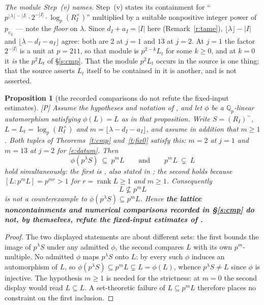 \documentclass[11pt]{article}
\theoremstyle{plain}
\newtheorem{proposition}[theorem]{Proposition}
\theoremstyle{definition}
\begin{document}
\begin{enumerate}[label=(W\arabic*),leftmargin=3.2em,itemsep=3pt]
 \emph{The module Step~(v) names.}  Step~(v) states its containment for
 ``$p^{\lfloor\lambda\rfloor-|I|}\cdot2^{-|I|}\cdot\log_p(R_I^{\times})$''
 multiplied by a suitable nonpositive integer power of $p_{v_{\mathbb{Q}}}$ ---
 note the \emph{floor} on $\lambda$.  Since $d_I+a_I=|I|$ here
 (Remark~\ref{r:tame}), $\lfloor\lambda\rfloor-|I|$ and
 $\lfloor\lambda-d_I-a_I\rfloor$ agree: both are $2$ at $j=1$ and $13$ at $j=2$.
 At $j=1$ the factor $2^{-|I|}$ is a unit at $p=211$, so that module is
 $p^{2-k}L_t$ for some $k\ge0$, and at $k=0$ it \emph{is} the $p^2L_t$ of
 \S\ref{s:cmp}.  That the module $p^2L_t$ occurs in the source is one thing;
 that the source asserts $L_t$ itself to be contained in it is another, and is
 not asserted.
\end{enumerate}

\begin{proposition}[the recorded comparisons do not refute the fixed-input
estimates]\label{p:nogo}
\textup{[P]}  Assume the hypotheses and notation of \cite[Prop.~1.2]{IUT4}, and
let $\phi$ be a $\mathbb{Q}_p$-linear automorphism satisfying $\phi(L)=L$ as in
that proposition.  Write $S=(R_I)^{\sim}$, $L=L_t=\log_p(R_I^{\times})$ and
$m=\lfloor\lambda-d_I-a_I\rfloor$, and assume in addition that $m\ge1$.  Both
tuples of Theorems~\ref{t:cmp} and~\ref{t:fix0} satisfy this: $m=2$ at $j=1$ and
$m=13$ at $j=2$ for \eqref{e:datum}.  Then
\[
 \phi(p^{\lambda}S)\ \subseteq\ p^{m}L
 \qquad\text{and}\qquad
 p^{m}L\ \subsetneq\ L
\]
hold \emph{simultaneously}: the first is \cite[Prop.~1.2(ii)]{IUT4}, also stated
in \cite[Prop.~1.4(iii)]{IUT4}; the second holds because
$[L:p^{m}L]=p^{mr}>1$ for $r=\operatorname{rank}L\ge1$ and $m\ge1$.
Consequently
\[
 L\not\subseteq p^{m}L
\]
is \emph{not} a counterexample to $\phi(p^{\lambda}S)\subseteq p^{m}L$.  Hence
\textbf{the lattice noncontainments and numerical comparisons recorded in
\S\ref{s:cmp} do not, by themselves, refute the fixed-input estimates of
\cite{IUT4}.}
\end{proposition}

\begin{proof}
The two displayed statements are about different sets: the first bounds the image
of $p^{\lambda}S$ under any admitted $\phi$, the second compares $L$ with its own
$p^{m}$-multiple.  No admitted $\phi$ maps $p^{\lambda}S$ onto $L$: by
\cite[Prop.~1.2]{IUT4} every such $\phi$ induces an automorphism of $L$, so
$\phi(p^{\lambda}S)\subseteq p^{m}L\subsetneq L=\phi(L)$, whence
$p^{\lambda}S\ne L$ since $\phi$ is injective.  The hypothesis $m\ge1$ is needed
for the strictness: at $m=0$ the second display would read $L\subseteq L$.  A set-theoretic failure of $L\subseteq p^{m}L$ therefore
places no constraint on the first inclusion.
\end{proof}
\end{document}
